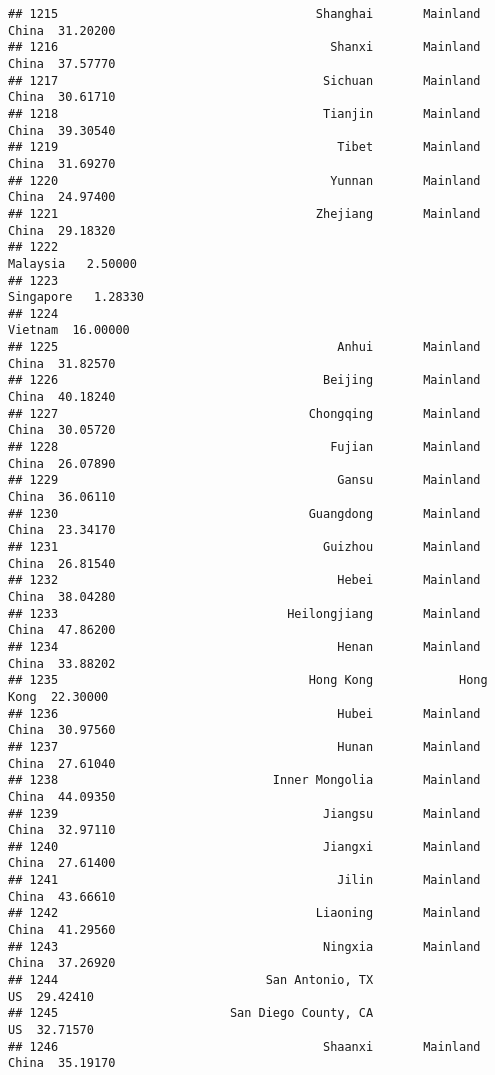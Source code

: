 \documentclass[
]{article}
\begin{document}
\begin{verbatim}
## 1215                                    Shanghai       Mainland China  31.20200
## 1216                                      Shanxi       Mainland China  37.57770
## 1217                                     Sichuan       Mainland China  30.61710
## 1218                                     Tianjin       Mainland China  39.30540
## 1219                                       Tibet       Mainland China  31.69270
## 1220                                      Yunnan       Mainland China  24.97400
## 1221                                    Zhejiang       Mainland China  29.18320
## 1222                                                         Malaysia   2.50000
## 1223                                                        Singapore   1.28330
## 1224                                                          Vietnam  16.00000
## 1225                                       Anhui       Mainland China  31.82570
## 1226                                     Beijing       Mainland China  40.18240
## 1227                                   Chongqing       Mainland China  30.05720
## 1228                                      Fujian       Mainland China  26.07890
## 1229                                       Gansu       Mainland China  36.06110
## 1230                                   Guangdong       Mainland China  23.34170
## 1231                                     Guizhou       Mainland China  26.81540
## 1232                                       Hebei       Mainland China  38.04280
## 1233                                Heilongjiang       Mainland China  47.86200
## 1234                                       Henan       Mainland China  33.88202
## 1235                                   Hong Kong            Hong Kong  22.30000
## 1236                                       Hubei       Mainland China  30.97560
## 1237                                       Hunan       Mainland China  27.61040
## 1238                              Inner Mongolia       Mainland China  44.09350
## 1239                                     Jiangsu       Mainland China  32.97110
## 1240                                     Jiangxi       Mainland China  27.61400
## 1241                                       Jilin       Mainland China  43.66610
## 1242                                    Liaoning       Mainland China  41.29560
## 1243                                     Ningxia       Mainland China  37.26920
## 1244                             San Antonio, TX                   US  29.42410
## 1245                        San Diego County, CA                   US  32.71570
## 1246                                     Shaanxi       Mainland China  35.19170

\end{verbatim}
\end{document}
